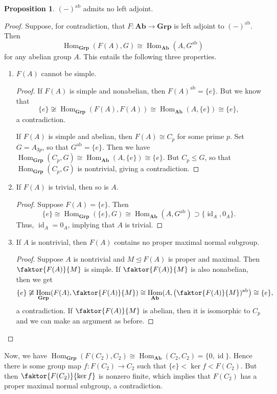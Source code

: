 \documentclass[10pt,letterpaper,cm]{nupset}
\theoremstyle{definition}
\theoremstyle{theorem}
\newtheorem{prop}[definition]{Proposition}
\theoremstyle{remark}
\newcommand{\1}{\mathbf{1}}
\newcommand{\0}{\vec 0}
\DeclareMathOperator{\id}{id}
\DeclareMathOperator{\ab}{ab}
\DeclareMathOperator{\Hom}{Hom}
\begin{document}
\begin{prop}
$(-)^{\ab}$ admits no left adjoint.
\end{prop}
\begin{proof}
Suppose, for contradiction, that $F: \mathbf{Ab} \to \mathbf{Grp}$ is  left adjoint to $(-)^{\ab}$. Then $$\Hom_{\mathbf{Grp}}(F(A), G) \cong \Hom_{\mathbf{Ab}}(A, G^{\ab})$$ for any abelian group $A$. This entails the following three properties.
\begin{enumerate}
\item $F(A)$ cannot be simple.
\begin{proof}
If $F(A)$ is simple and nonabelian, then $F(A)^{\ab} =\{e\}$. But we know that $$\{e\} \not \cong \Hom_{\mathbf{Grp}}(F(A), F(A)) \cong \Hom_{\mathbf{Ab}}(A, \{e\})\cong \{e\},$$ a contradiction.

If $F(A)$ is simple and abelian, then $F(A) \cong C_p$ for some prime $p$. Set $G = A_{3p}$, so that $G^{\ab} = \{e\}$. Then  we have $\Hom_{\mathbf{Grp}}(C_p, G) \cong \Hom_{\mathbf{Ab}}(A, \{e\}) \cong \{e\}.$ But $C_p \leq G$, so that $\Hom_{\mathbf{Grp}}(C_p, G) $ is nontrivial, giving a contradiction. 
\end{proof}
\item If $F(A)$ is trivial, then so is $A$.
\begin{proof}
Suppose $F(A)= \{e\}$. Then $$\{e\} \cong \Hom_{\mathbf{Grp}}(\{e\}, G) \cong \Hom_{\mathbf{Ab}}(A, G^{\ab})\supset \{\id_A, 0_A\}.$$ Thus, $\id_A =0_A$, implying that $A$ is trivial.
\end{proof}
\item If $A$ is nontrivial, then $F(A)$ contains no proper maximal normal subgroup. 
\begin{proof}
Suppose $A$ is nontrivial and $M \unlhd F(A)$ is proper and maximal. Then $\faktor{F(A)}{M}$ is simple. If $\faktor{F(A)}{M}$ is also nonabelian, then we get
$$\{e\} \not \cong \Hom_{\mathbf{Grp}}(F(A), \faktor{F(A)}{M}) \cong \Hom_{\mathbf{Ab}}(A, \big (\faktor{F(A)}{M})^{\ab} \big )\cong \{e\},$$ a contradiction. If $\faktor{F(A)}{M}$ is abelian, then it is isomorphic to $C_p$ and we can make an argument as before.
\end{proof}
\end{enumerate}
\end{proof}
Now, we have $ \Hom_{\mathbf{Grp}}(F(C_2), C_2) \cong \Hom_{\mathbf{Ab}}(C_2, C_2) =\{0, \id\}$.  Hence there is some group map $f : F(C_2) \rightarrow C_2$ such that $\{e\} < \ker f < F(C_2)$. But then $\faktor{F(C_2)}{\ker f}$ is nonzero finite, which implies that $F(C_2)$ has a proper maximal normal subgroup, a contradiction. 
\end{document}
